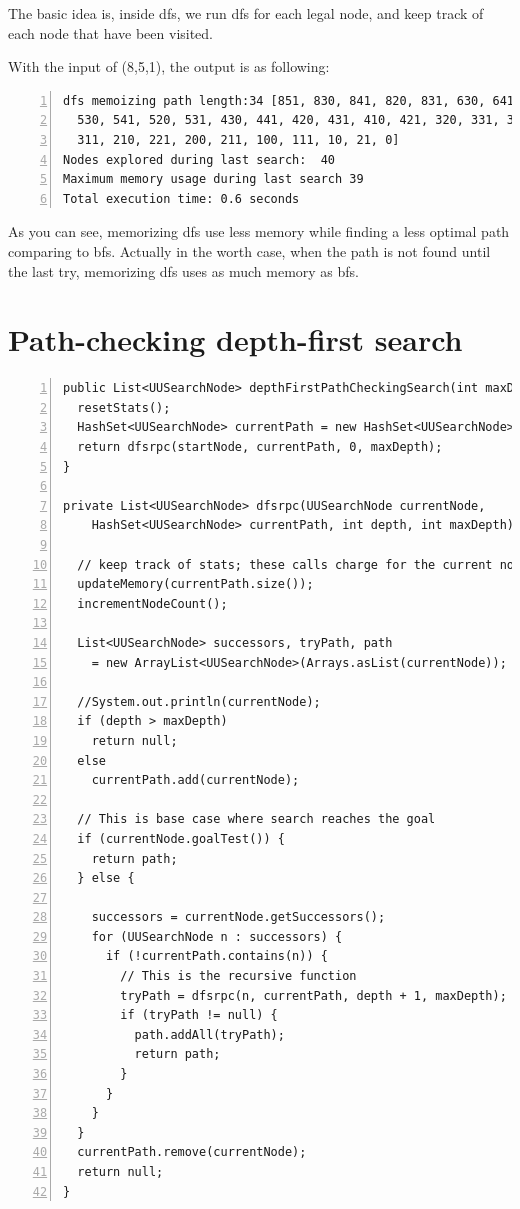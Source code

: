 \documentclass{article}
\begin{document}
The basic idea is, inside dfs, we run dfs for each legal node, and keep track of each node that have been visited.

With the input of (8,5,1), the output is as following:

\begin{lstlisting}[numbers=left]
dfs memoizing path length:34 [851, 830, 841, 820, 831, 630, 641, 540, 551,
  530, 541, 520, 531, 430, 441, 420, 431, 410, 421, 320, 331, 310, 321, 300,
  311, 210, 221, 200, 211, 100, 111, 10, 21, 0]
Nodes explored during last search:  40
Maximum memory usage during last search 39
Total execution time: 0.6 seconds
\end{lstlisting}

As you can see, memorizing dfs use less memory while finding a less optimal path comparing to bfs. Actually in the worth case, when the path is not found until the last try, memorizing dfs uses as much memory as bfs.















\section{Path-checking depth-first search}

\begin{lstlisting}[numbers=left]
public List<UUSearchNode> depthFirstPathCheckingSearch(int maxDepth) {
  resetStats();
  HashSet<UUSearchNode> currentPath = new HashSet<UUSearchNode>();
  return dfsrpc(startNode, currentPath, 0, maxDepth);
}

private List<UUSearchNode> dfsrpc(UUSearchNode currentNode,
    HashSet<UUSearchNode> currentPath, int depth, int maxDepth) {

  // keep track of stats; these calls charge for the current node
  updateMemory(currentPath.size());
  incrementNodeCount();

  List<UUSearchNode> successors, tryPath, path 
  	= new ArrayList<UUSearchNode>(Arrays.asList(currentNode));

  //System.out.println(currentNode);
  if (depth > maxDepth)
    return null;
  else 
    currentPath.add(currentNode);

  // This is base case where search reaches the goal
  if (currentNode.goalTest()) {
    return path;
  } else {
  
    successors = currentNode.getSuccessors();
    for (UUSearchNode n : successors) {
      if (!currentPath.contains(n)) {
        // This is the recursive function
        tryPath = dfsrpc(n, currentPath, depth + 1, maxDepth);
        if (tryPath != null) {
          path.addAll(tryPath);
          return path;
        }
      }
    }
  }
  currentPath.remove(currentNode);
  return null;
}
\end{lstlisting}
\end{document}
